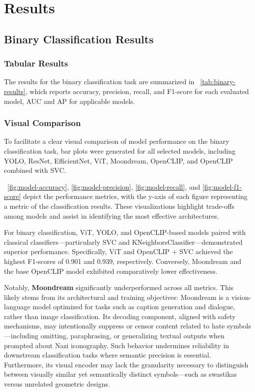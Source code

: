
\chapter{Results}\label{chapter:results}


\section{Binary Classification Results}

\subsection{Tabular Results}

The results for the binary classification task are summarized in ~\autoref{tab:binary-results}, which reports
accuracy, precision, recall, and F1-score for each evaluated model, \ac{AUC} and \ac{AP} for applicable models.



\subsection{Visual Comparison}

To facilitate a clear visual comparison of model performance on the binary classification task, bar plots were
generated for all selected models, including \ac{YOLO}, \ac{ResNet}, EfficientNet, \ac{ViT}, Moondream, OpenCLIP, and
OpenCLIP combined with \ac{SVC}.

~\autoref{fig:model-accuracy}, \autoref{fig:model-precision}, \autoref{fig:model-recall}, and
\autoref{fig:model-f1-score} depict the performance metrics, with the y-axis of each figure representing a metric of
the classification results. These visualizations highlight trade-offs among models and assist in identifying
the most effective architectures.

For binary classification, \ac{ViT}, \ac{YOLO}, and OpenCLIP-based models paired with classical
classifiers—particularly \ac{SVC} and KNeighborsClassifier—demonstrated superior performance. Specifically, \ac{ViT} and
OpenCLIP + \ac{SVC} achieved the highest F1-scores of 0.901 and 0.939, respectively. Conversely, Moondream and the
base OpenCLIP model exhibited comparatively lower effectiveness.

Notably, \textbf{Moondream} significantly underperformed across all metrics. This likely stems from its
architectural and training objectives: Moondream is a vision-language model optimized for tasks such as caption
generation and dialogue, rather than image classification. Its decoding component, aligned with safety mechanisms,
may intentionally suppress or censor content related to hate symbols—including omitting, paraphrasing, or
generalizing textual outputs when prompted about Nazi iconography. Such behavior undermines reliability in
downstream classification tasks where semantic precision is essential. Furthermore, its visual encoder may lack the
granularity necessary to distinguish between visually similar yet semantically distinct symbols—such as swastikas
versus unrelated geometric designs.

